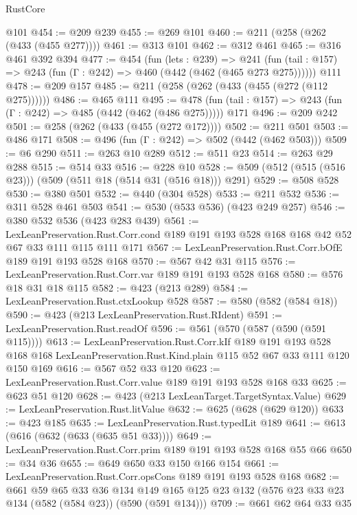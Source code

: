 \begin{lexlean}{RustCore}
\begin{coremodule}
    @101
@454 := @209 @239
@455 := @269 @101
@460 := @211 (@258 (@262 (@433 (@455 @277))))
@461 := @313 @101
@462 := @312 @461
@465 := @316 @461 @392 @394
@477 := @454
    (fun (lets : @239) =>
    @241 (fun (tail : @157) => @243 (fun (Γ : @242) => @460 (@442 (@462 (@465 @273 @275))))))
    @111
@478 := @209 @157
@485 := @211 (@258 (@262 (@433 (@455 (@272 (@112 @275))))))
@486 := @465 @111
@495 := @478 (fun (tail : @157) => @243 (fun (Γ : @242) => @485 (@442 (@462 (@486 @275))))) @171
@496 := @209 @242
@501 := @258 (@262 (@433 (@455 (@272 @172))))
@502 := @211 @501
@503 := @486 @171
@508 := @496 (fun (Γ : @242) => @502 (@442 (@462 @503)))
@509 := @6 @290
@511 := @263 @10 @289
@512 := @511 @23
@514 := @263 @29 @288
@515 := @514 @33
@516 := @228 @10
@528 := @509 (@512 (@515 (@516 @23))) (@509 (@511 @18 (@514 @31 (@516 @18))) @291)
@529 := @508 @528
@530 := @380 @501
@532 := @440 (@304 @528)
@533 := @211 @532
@536 := @311 @528 @461 @503
@541 := @530 (@533 @536) (@423 @249 @257)
@546 := @380 @532 @536 (@423 @283 @439)
@561 := LexLeanPreservation.Rust.Corr.cond
    @189
    @191
    @193
    @528
    @168
    @168
    @42
    @52
    @67
    @33
    @111
    @115
    @111
    @171
@567 := LexLeanPreservation.Rust.Corr.bOfE @189 @191 @193 @528 @168
@570 := @567 @42 @31 @115
@576 := LexLeanPreservation.Rust.Corr.var @189 @191 @193 @528 @168
@580 := @576 @18 @31 @18 @115
@582 := @423 (@213 @289)
@584 := LexLeanPreservation.Rust.ctxLookup @528
@587 := @580 (@582 (@584 @18))
@590 := @423 (@213 LexLeanPreservation.Rust.RIdent)
@591 := LexLeanPreservation.Rust.readOf
@596 := @561 (@570 (@587 (@590 (@591 @115))))
@613 := LexLeanPreservation.Rust.Corr.kIf
    @189
    @191
    @193
    @528
    @168
    @168
    LexLeanPreservation.Rust.Kind.plain
    @115
    @52
    @67
    @33
    @111
    @120
    @150
    @169
@616 := @567 @52 @33 @120
@623 := LexLeanPreservation.Rust.Corr.value @189 @191 @193 @528 @168 @33
@625 := @623 @51 @120
@628 := @423 (@213 LexLeanTarget.TargetSyntax.Value)
@629 := LexLeanPreservation.Rust.litValue
@632 := @625 (@628 (@629 @120))
@633 := @423 @185
@635 := LexLeanPreservation.Rust.typedLit @189
@641 := @613 (@616 (@632 (@633 (@635 @51 @33))))
@649 := LexLeanPreservation.Rust.Corr.prim @189 @191 @193 @528 @168 @55 @66
@650 := @34 @36
@655 := @649 @650 @33 @150 @166 @154
@661 := LexLeanPreservation.Rust.Corr.opsCons @189 @191 @193 @528 @168
@682 := @661
    @59
    @65
    @33
    @36
    @134
    @149
    @165
    @125
    @23
    @132
    (@576 @23 @33 @23 @134 (@582 (@584 @23)) (@590 (@591 @134)))
@709 := @661
    @62
    @64
    @33
    @35

\end{coremodule}
\end{lexlean}
